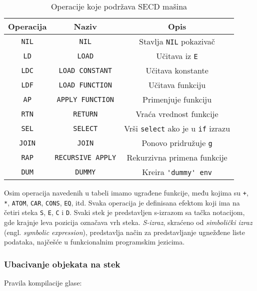 \begin{table}[h!]
	\centering
	\label{tab:tabelaInstr}
	\caption{Operacije koje podržava SECD mašina}
	\begin{tabular}{|c|c|c|} \hline
		Operacija&Naziv&Opis\\ \hline
		\verb|NIL| & \verb|NIL| & Stavlja \verb|NIL| pokazivač\\ \hline
		\verb|LD| & \verb|LOAD| & Učitava iz \verb|E| \\ \hline
		\verb|LDC| & \verb|LOAD CONSTANT| & Učitava konstante\\ \hline
		\verb|LDF| & \verb|LOAD FUNCTION| & Učitava funkciju \\ \hline
		\verb|AP| & \verb|APPLY FUNCTION| & Primenjuje funkciju\\ \hline
		\verb|RTN| & \verb|RETURN| & Vraća vrednost funkcije \\ \hline
		\verb|SEL| & \verb|SELECT| & Vrši \verb|select| ako je u \verb|if| izrazu\\ \hline
		\verb|JOIN| & \verb|JOIN| & Ponovo pridružuje \verb|g|\\ \hline
		\verb|RAP| & \verb|RECURSIVE APPLY| & Rekurzivna primena funkcije\\ \hline
		\verb|DUM| & \verb|DUMMY| & Kreira \verb|'dummy' env| \\ \hline
	\end{tabular}
\end{table}
Osim operacija navedenih u tabeli imamo ugrađene funkcije, među kojima su \verb|+|, \verb|*|, \verb|ATOM|, \verb|CAR|, \verb|CONS|, \verb|EQ|, itd. Svaka operacija je definisana efektom koji ima na četiri steka \verb|S|, \verb|E|, \verb|C| i \verb|D|. Svaki stek je predstavljen s-izrazom sa tačka notacijom, gde krajnje leva pozicija označava vrh steka. \textit{S-izraz}, skraćeno od \textit{simbolički izraz} (engl. \textit{symbolic expression}), predstavlja način za predstavljanje ugnežđene liste podataka, najčešće u funkcionalnim programskim jezicima.

\subsubsection{Ubacivanje objekata na stek}

Pravila kompilacije glase:

